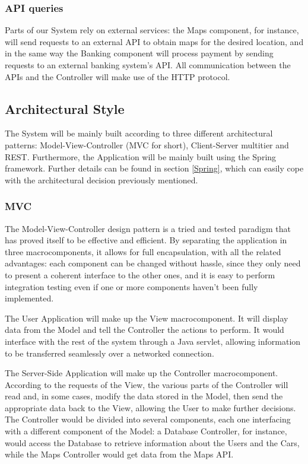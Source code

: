 \documentclass[12pt]{article}
\begin{document}
\subsubsection{API queries}
Parts of our System rely on external services: the Maps component, for instance, will send requests to an external API to obtain maps for the desired location, and in the same way the Banking component will process payment by sending requests to an external banking system's API. All communication between the APIs and the Controller will make use of the HTTP protocol.

\subsection{Architectural Style}
The System will be mainly built according to three different architectural patterns: Model-View-Controller (MVC for short), Client-Server multitier and REST. 
Furthermore, the Application will be mainly built using the Spring framework. Further details can be found in section \ref{Spring}, which can easily cope with the architectural decision previously mentioned.

\subsubsection{MVC}\label{MVC}
The Model-View-Controller design pattern is a tried and tested paradigm that has proved itself to be effective and efficient. By separating the application in three macrocomponents, it allows for full encapsulation, with all the related advantages: each component can be changed without hassle, since they only need to present a coherent interface to the other ones, and it is easy to perform integration testing even if one or more components haven't been fully implemented.

The User Application will make up the View macrocomponent. It will display data from the Model and tell the Controller the actions to perform. It would interface with the rest of the system through a Java servlet, allowing information to be transferred seamlessly over a networked connection.

The Server-Side Application will make up the Controller macrocomponent. According to the requests of the View, the various parts of the Controller will read and, in some cases, modify the data stored in the Model, then send the appropriate data back to the View, allowing the User to make further decisions. The Controller would be divided into several components, each one interfacing with a different component of the Model: a Database Controller, for instance, would access the Database to retrieve information about the Users and the Cars, while the Maps Controller would get data from the Maps API.
\end{document}
